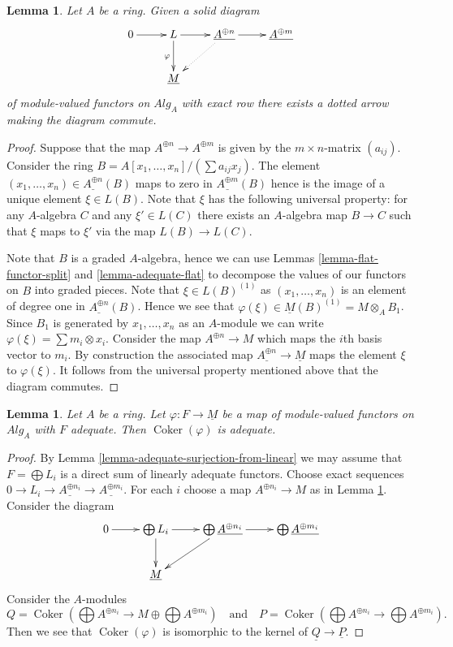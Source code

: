 \documentclass{stacks-project}
\theoremstyle{plain}
\newtheorem{lemma}[subsection]{Lemma}
\theoremstyle{definition}
\theoremstyle{remark}
\numberwithin{equation}{subsection}
\def\Coker{\mathop{\mathrm{Coker}}}
\begin{document}
\begin{lemma}
\label{lemma-lift-map}
Let $A$ be a ring. Given a solid diagram
$$
\xymatrix{
0 \ar[r] &
L \ar[d]_\varphi \ar[r] &
\underline{A^{\oplus n}} \ar[r] \ar@{..>}[ld] &
\underline{A^{\oplus m}} \\
& \underline{M}
}
$$
of module-valued functors on $\textit{Alg}_A$
with exact row there exists a dotted arrow making the diagram commute.
\end{lemma}

\begin{proof}
Suppose that the map $A^{\oplus n} \to A^{\oplus m}$ is given by the
$m \times n$-matrix $(a_{ij})$. Consider the ring
$B = A[x_1, \ldots, x_n]/(\sum a_{ij}x_j)$. The element
$(x_1, \ldots, x_n) \in \underline{A^{\oplus n}}(B)$ maps to zero in
$\underline{A^{\oplus m}}(B)$ hence is the image of a unique element
$\xi \in L(B)$. Note that $\xi$ has the following universal property:
for any $A$-algebra $C$ and any $\xi' \in L(C)$ there exists an $A$-algebra
map $B \to C$ such that $\xi$ maps to $\xi'$ via the map $L(B) \to L(C)$.

\medskip\noindent
Note that $B$ is a graded $A$-algebra, hence we can use
Lemmas \ref{lemma-flat-functor-split} and \ref{lemma-adequate-flat}
to decompose the values of our functors on $B$ into graded pieces.
Note that $\xi \in L(B)^{(1)}$ as $(x_1, \ldots, x_n)$ is an element
of degree one in $\underline{A^{\oplus n}}(B)$. Hence we see that
$\varphi(\xi) \in \underline{M}(B)^{(1)} = M \otimes_A B_1$.
Since $B_1$ is generated by $x_1, \ldots, x_n$ as an $A$-module we
can write $\varphi(\xi) = \sum m_i \otimes x_i$. Consider the map
$A^{\oplus n} \to M$ which maps the $i$th basis vector to $m_i$.
By construction the associated map
$\underline{A^{\oplus n}} \to \underline{M}$
maps the element $\xi$ to $\varphi(\xi)$. It follows from the
universal property mentioned above that the diagram commutes.
\end{proof}

\begin{lemma}
\label{lemma-cokernel-into-module}
Let $A$ be a ring.
Let $\varphi : F \to \underline{M}$ be a map of module-valued functors
on $\textit{Alg}_A$ with $F$ adequate.
Then $\Coker(\varphi)$ is adequate.
\end{lemma}

\begin{proof}
By
Lemma \ref{lemma-adequate-surjection-from-linear}
we may assume that $F = \bigoplus L_i$ is a direct sum of linearly adequate
functors. Choose exact sequences
$0 \to L_i \to \underline{A^{\oplus n_i}} \to \underline{A^{\oplus m_i}}$.
For each $i$ choose a map $A^{\oplus n_i} \to M$ as in
Lemma \ref{lemma-lift-map}.
Consider the diagram
$$
\xymatrix{
0 \ar[r] &
\bigoplus L_i  \ar[r] \ar[d] &
\bigoplus \underline{A^{\oplus n_i}} \ar[r] \ar[ld] &
\bigoplus \underline{A^{\oplus m_i}} \\
& \underline{M}
}
$$
Consider the $A$-modules
$$
Q =
\Coker(\bigoplus A^{\oplus n_i} \to M \oplus \bigoplus A^{\oplus m_i})
\quad\text{and}\quad
P = \Coker(\bigoplus A^{\oplus n_i} \to \bigoplus A^{\oplus m_i}).
$$
Then we see that $\Coker(\varphi)$ is isomorphic to the
kernel of $\underline{Q} \to \underline{P}$.
\end{proof}
\end{document}
